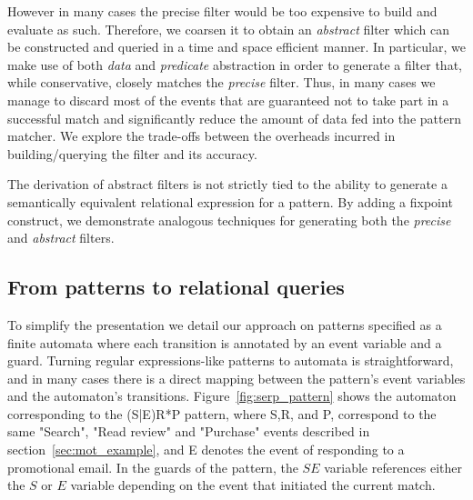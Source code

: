 However in many cases the precise filter would be too expensive to build and 
evaluate as such.
Therefore, we coarsen it to obtain an {\em abstract} filter
which can be constructed and queried in a time and space efficient manner.
In particular, we make use of both {\em data} and {\em predicate} 
abstraction in order to generate a filter that, while conservative, closely 
matches the {\em precise} filter. 
Thus, in many cases we manage to discard most of the events that are guaranteed 
not to take part in a successful match and significantly reduce the amount of 
data fed into the pattern matcher.
We explore the trade-offs between the overheads incurred in building/querying
the filter and its accuracy. 

The derivation of abstract filters is not strictly tied to the ability to 
generate a semantically equivalent relational expression for a pattern. 
By adding a fixpoint construct, we demonstrate analogous techniques for 
generating both the {\em precise} and {\em abstract} filters.

\subsection{From patterns to relational queries}

To simplify the presentation we detail our approach on patterns specified as a 
finite automata where each transition is annotated by an event 
variable and a guard.
Turning regular expressions-like patterns to automata is straightforward,
and in many cases there is a direct mapping between the pattern's event 
variables and the automaton's transitions.
Figure~\ref{fig:serp_pattern} shows the automaton corresponding to the 
(S|E)R*P pattern, where S,R, and P, correspond to the same "Search", "Read 
review" and "Purchase" events described in section~\ref{sec:mot_example}, and E 
denotes the event of responding to a promotional email.
In the guards of the pattern, the $SE$ variable references either the $S$ or 
$E$ variable depending on the event that initiated the current match. 


